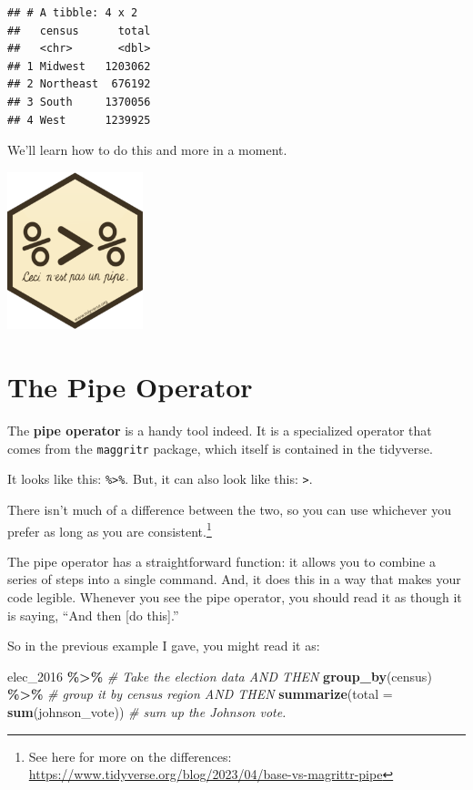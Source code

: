 \documentclass[
]{book}
\newenvironment{Shaded}{\begin{snugshade}}{\end{snugshade}}
\newcommand{\AttributeTok}[1]{\textcolor[rgb]{0.13,0.29,0.53}{#1}}
\newcommand{\CommentTok}[1]{\textcolor[rgb]{0.56,0.35,0.01}{\textit{#1}}}
\newcommand{\FunctionTok}[1]{\textcolor[rgb]{0.13,0.29,0.53}{\textbf{#1}}}
\newcommand{\NormalTok}[1]{#1}
\newcommand{\SpecialCharTok}[1]{\textcolor[rgb]{0.81,0.36,0.00}{\textbf{#1}}}
\begin{document}
\begin{verbatim}
## # A tibble: 4 x 2
##   census      total
##   <chr>       <dbl>
## 1 Midwest   1203062
## 2 Northeast  676192
## 3 South     1370056
## 4 West      1239925
\end{verbatim}

We'll learn how to do this and more in a moment.

\includegraphics[width=1.55208in,height=\textheight]{docs/_main_files/figure-html/ceci_pipe.png}

\hypertarget{the-pipe-operator}{%
\section{The Pipe Operator}\label{the-pipe-operator}}

The \textbf{pipe operator} is a handy tool indeed. It is a specialized operator that comes from the \texttt{maggritr} package, which itself is contained in the tidyverse.

It looks like this: \texttt{\%\textgreater{}\%}. But, it can also look like this: \texttt{\textbar{}\textgreater{}}.

There isn't much of a difference between the two, so you can use whichever you prefer as long as you are consistent.\footnote{See here for more on the differences: \href{https://www.tidyverse.org/blog/2023/04/base-vs-magrittr-pipe/\#}{https://www.tidyverse.org/blog/2023/04/base-vs-magrittr-pipe}}

The pipe operator has a straightforward function: it allows you to combine a series of steps into a single command. And, it does this in a way that makes your code legible. Whenever you see the pipe operator, you should read it as though it is saying, ``And then {[}do this{]}.''

So in the previous example I gave, you might read it as:

\begin{Shaded}
\begin{Highlighting}[]
\NormalTok{elec\_2016 }\SpecialCharTok{\%\textgreater{}\%}                            \CommentTok{\# Take the election data AND THEN}
  \FunctionTok{group\_by}\NormalTok{(census) }\SpecialCharTok{\%\textgreater{}\%}                   \CommentTok{\# group it by census region AND THEN}
  \FunctionTok{summarize}\NormalTok{(}\AttributeTok{total =} \FunctionTok{sum}\NormalTok{(johnson\_vote))   }\CommentTok{\# sum up the Johnson vote.}
\end{Highlighting}
\end{Shaded}
\end{document}
